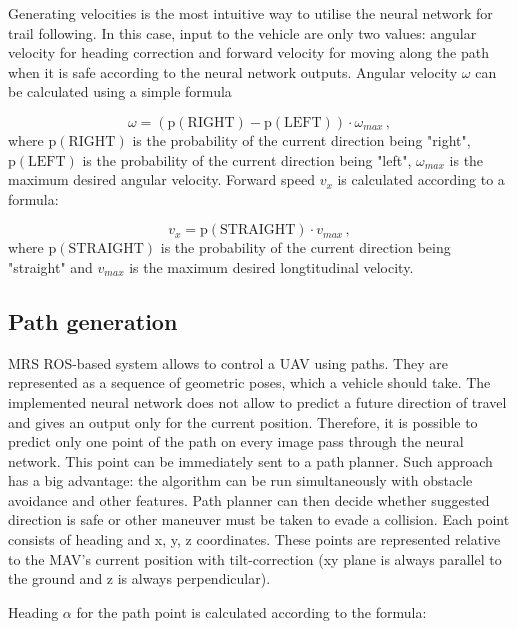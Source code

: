 Generating velocities is the most intuitive way to utilise the neural network for trail following. In this case, input to the vehicle are only two values: angular velocity for heading correction and forward velocity for moving along the path when it is safe according to the neural network outputs. Angular velocity $\omega$ can be calculated using a simple formula

\begin{equation}
	\omega = (\textrm{p}(\textrm{RIGHT}) - \textrm{p}(\textrm{LEFT}))\cdot\omega_{max}\,,
\end{equation}
where $\textrm{p}(\textrm{RIGHT})$ is the probability of the current direction being "right", $\textrm{p}(\textrm{LEFT})$ is the probability of the current direction being "left", $\omega_{max}$ is the maximum desired angular velocity. Forward speed $v_x$ is calculated according to a formula:

\begin{equation}
	v_x = \textrm{p}(\textrm{STRAIGHT})\cdot v_{max}\,,
\end{equation}
where $\textrm{p}(\textrm{STRAIGHT})$ is the probability of the current direction being "straight" and $v_{max}$ is the maximum desired longtitudinal velocity.


\subsection{Path generation}

\acs{MRS} \acs{ROS}-based system allows to control a \acs{UAV} using paths. They are represented as a sequence of geometric poses, which a vehicle should take. The implemented neural network does not allow to predict a future direction of travel and gives an output only for the current position. Therefore, it is possible to predict only one point of the path on every image pass through the neural network. This point can be immediately sent to a path planner. Such approach has a big advantage: the algorithm can be run simultaneously with obstacle avoidance and other features. Path planner can then decide whether suggested direction is safe or other maneuver must be taken to evade a collision. Each point consists of heading and x, y, z coordinates. These points are represented relative to the \acs{MAV}'s current position with tilt-correction (xy plane is always parallel to the ground and z is always perpendicular). 

Heading $\alpha$ for the path point is calculated according to the formula:

